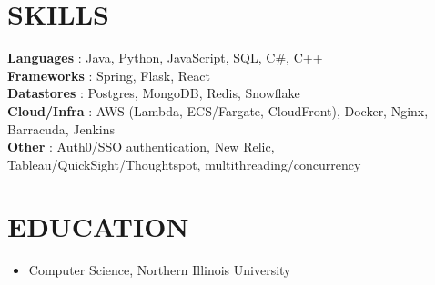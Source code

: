\documentclass[letterpaper,11pt]{article}
\newcommand{\resumeItem}[1]{
    \item\small{
            {#1 \vspace{-1pt}}
    }
}
\newcommand{\resumeSubHeadingListStart}{\begin{itemize}[leftmargin=0in, label={}]}
\newcommand{\resumeSubHeadingListEnd}{\end{itemize}}
\begin{document}
\section{SKILLS}
\begin{itemize}[leftmargin=0in, label={}]
\small{\item{
\textbf{Languages} {: Java, Python, JavaScript, SQL, C\#, C++}\vspace{2pt} \\
\textbf{Frameworks} {: Spring, Flask, React}\vspace{2pt} \\
\textbf{Datastores} {: Postgres, MongoDB, Redis, Snowflake}\vspace{2pt} \\
\textbf{Cloud/Infra} {: AWS (Lambda, ECS/Fargate, CloudFront), Docker, Nginx, Barracuda, Jenkins}\vspace{2pt} \\
\textbf{Other} {: Auth0/SSO authentication, New Relic, Tableau/QuickSight/Thoughtspot, multithreading/concurrency}
}}
\end{itemize}


\section {EDUCATION}
\resumeSubHeadingListStart
\resumeItem{Computer Science, Northern Illinois University}
\resumeSubHeadingListEnd


\end{document}
